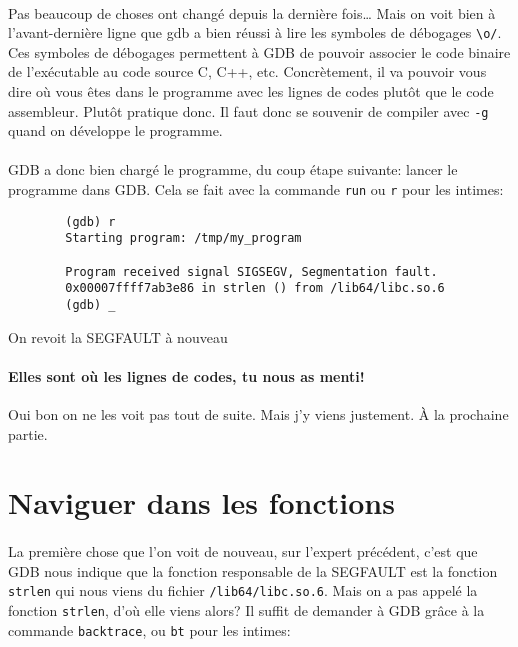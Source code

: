 \paragraph{} Pas beaucoup de choses ont changé depuis la dernière fois\ldots
Mais on voit bien à l'avant-dernière ligne que gdb a bien réussi à lire les
symboles de débogages \texttt{{\textbackslash}o/}. Ces symboles de débogages
permettent à GDB de pouvoir associer le code binaire de l'exécutable au code
source C, C++, etc. Concrètement, il va pouvoir vous dire où vous êtes dans le
programme avec les lignes de codes plutôt que le code assembleur. Plutôt
pratique donc. Il faut donc se souvenir de compiler avec \texttt{-g} quand on
développe le programme.

\paragraph{} GDB a donc bien chargé le programme, du coup étape suivante:
lancer le programme dans GDB. Cela se fait avec la commande \texttt{run} ou
\texttt{r} pour les intimes:

\begin{listing}[H]
	\begin{verbatim}
		(gdb) r
		Starting program: /tmp/my_program

		Program received signal SIGSEGV, Segmentation fault.
		0x00007ffff7ab3e86 in strlen () from /lib64/libc.so.6
		(gdb) _
	\end{verbatim}
	\caption{On revoit la SEGFAULT à nouveau}
\end{listing}

\paragraph{Elles sont où les lignes de codes, tu nous as menti!} Oui bon on ne
les voit pas tout de suite. Mais j'y viens justement. À la prochaine partie.

\section{Naviguer dans les fonctions}

\paragraph{} La première chose que l'on voit de nouveau, sur l'expert
précédent, c'est que GDB nous indique que la fonction responsable de la
SEGFAULT est la fonction \texttt{strlen} qui nous viens du fichier
\texttt{/lib64/libc.so.6}. Mais on a pas appelé la fonction
\texttt{strlen}, d'où elle viens alors? Il suffit de demander à GDB
grâce à la commande \texttt{backtrace}, ou \texttt{bt} pour les intimes:

